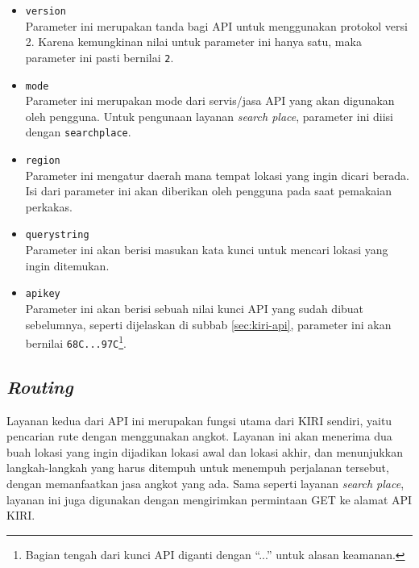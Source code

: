 \begin{itemize}
	\item \verb|version|\\
	Parameter ini merupakan tanda bagi API untuk menggunakan protokol versi 2. Karena kemungkinan nilai untuk parameter ini hanya satu, maka parameter ini pasti bernilai \verb|2|.
	\item \verb|mode|\\
	Parameter ini merupakan mode dari servis/jasa API yang akan digunakan oleh pengguna. Untuk pengunaan layanan \textit{search place}, parameter ini diisi dengan \verb|searchplace|.
	\item \verb|region|\\
	Parameter ini mengatur daerah mana tempat lokasi yang ingin dicari berada. Isi dari parameter ini akan diberikan oleh pengguna pada saat pemakaian perkakas.
	\item \verb|querystring|\\
	Parameter ini akan berisi masukan kata kunci untuk mencari lokasi yang ingin ditemukan.
	\item \verb|apikey|\\
	Parameter ini akan berisi sebuah nilai kunci API yang sudah dibuat sebelumnya, seperti dijelaskan di subbab \ref{sec:kiri-api}, parameter ini akan bernilai \verb|68C...97C|\footnote{Bagian tengah dari kunci API diganti dengan ``...'' untuk alasan keamanan.}.
\end{itemize}

\subsection{\textit{Routing}}
\label{sec:analysis-kiri-findroute}

Layanan kedua dari API ini merupakan fungsi utama dari KIRI sendiri, yaitu pencarian rute dengan menggunakan angkot. Layanan ini akan menerima dua buah lokasi yang ingin dijadikan lokasi awal dan lokasi akhir, dan menunjukkan langkah-langkah yang harus ditempuh untuk menempuh perjalanan tersebut, dengan memanfaatkan jasa angkot yang ada. Sama seperti layanan \textit{search place}, layanan ini juga digunakan dengan mengirimkan permintaan GET ke alamat API KIRI.

